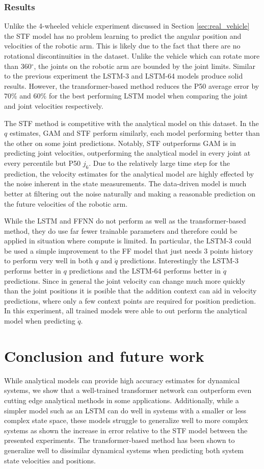 \documentclass[letterpaper, 10 pt, conference]{ieeeconf}  %
\begin{document}
\subsubsection{Results}
Unlike the 4-wheeled vehicle experiment discussed in Section \ref{sec:real_vehicle} the STF model has no problem learning to predict the angular position and velocities of the robotic arm. This is likely due to the fact that there are no rotational discontinuities in the dataset. Unlike the vehicle which can rotate more than 360$^\circ$, the joints on the robotic arm are bounded by the joint limits. Similar to the previous experiment the LSTM-3 and LSTM-64 models produce solid results. However, the transformer-based method reduces the P50 average error by $70\%$ and $60\%$ for the best performing LSTM model when comparing the joint and joint velocities respectively. 

The STF method is competitive with the analytical model on this dataset. In the $q$ estimates, GAM \cite{gaz2019dynamic} and STF perform similarly, each model performing better than the other on some joint predictions. Notably, STF outperforms GAM is in predicting joint velocities, outperforming the analytical model in every joint at every percentile but P50 $j_6$. Due to the relatively large time step for the prediction, the velocity estimates for the analytical model are highly effected by the noise inherent in the state measurements. The data-driven model is much better at filtering out the noise naturally and making a reasonable prediction on the future velocities of the robotic arm.

While the LSTM and FFNN do not perform as well as the transformer-based method, they do use far fewer trainable parameters and therefore could be applied in situation where compute is limited. In particular, the LSTM-3 could be used a simple improvement to the FF model that just needs 3 points history to perform very well in both $q$ and $\dot{q}$ predictions. Interestingly the LSTM-3 performs better in $q$ predictions and the LSTM-64 performs better in $\dot{q}$ predictions. Since in general the joint velocity can change much more quickly than the joint positions it is posible that the addition context can aid in velocity predictions, where only a few context points are required for position prediction. In this experiment, all trained models were able to out perform the analytical model when predicting $\dot{q}$.

\section{Conclusion and future work}\label{sec12}
While analytical models can provide high accuracy estimates for dynamical systems, we show that a well-trained transformer network can outperform even cutting edge analytical methods in some applications. Additionally, while a simpler model such as an LSTM can do well in systems with a smaller or less complex state space, these models struggle to generalize well to more complex systems as shown the increase in error relative to the STF model between the presented experiments. The transformer-based method has been shown to generalize well to dissimilar dynamical systems when predicting both system state velocities and positions. 
\end{document}
